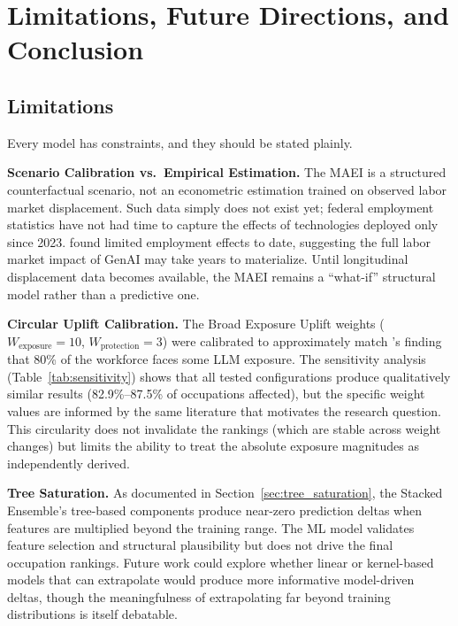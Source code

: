 \chapter{Limitations, Future Directions, and Conclusion}
\label{chap:conclusion}

\section{Limitations}
\label{sec:limitations}

Every model has constraints, and they should be stated plainly.

\textbf{Scenario Calibration vs.\ Empirical Estimation.}
The MAEI is a structured counterfactual scenario, not an econometric estimation
trained on observed labor market displacement.  Such data simply does not exist
yet; federal employment statistics have not had time to capture the effects of
technologies deployed only since 2023.  \citet{Anthropic_2026} found limited
employment effects to date, suggesting the full labor market impact of GenAI may
take years to materialize.  Until longitudinal displacement data becomes
available, the MAEI remains a ``what-if'' structural model rather than a
predictive one.

\textbf{Circular Uplift Calibration.}
The Broad Exposure Uplift weights ($W_{\text{exposure}} = 10$,
$W_{\text{protection}} = 3$) were calibrated to approximately match
\citet{Eloundou_Manning_2023}'s finding that 80\% of the workforce faces some
LLM exposure.  The sensitivity analysis (Table~\ref{tab:sensitivity}) shows that
all tested configurations produce qualitatively similar results
(82.9\%--87.5\% of occupations affected), but the specific weight values are
informed by the same literature that motivates the research question.  This
circularity does not invalidate the rankings (which are stable across weight
changes) but limits the ability to treat the absolute exposure magnitudes as
independently derived.

\textbf{Tree Saturation.}
As documented in Section~\ref{sec:tree_saturation}, the Stacked Ensemble's
tree-based components produce near-zero prediction deltas when features are
multiplied beyond the training range.  The ML model validates feature selection
and structural plausibility but does not drive the final occupation rankings.
Future work could explore whether linear or kernel-based models that can
extrapolate would produce more informative model-driven deltas, though the
meaningfulness of extrapolating far beyond training distributions is itself
debatable.

